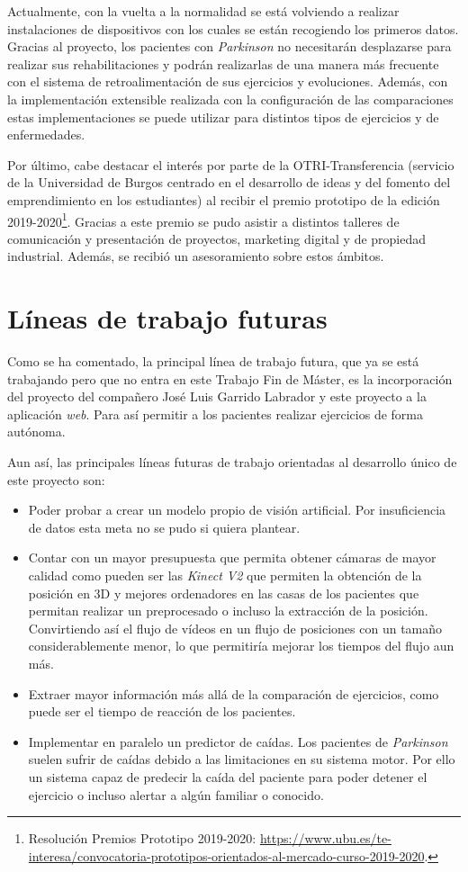 Actualmente, con la vuelta a la normalidad se está volviendo a realizar instalaciones de dispositivos con los cuales se están recogiendo los primeros datos. Gracias al proyecto, los pacientes con \textit{Parkinson} no necesitarán desplazarse para realizar sus rehabilitaciones y podrán realizarlas de una manera más frecuente con el sistema de retroalimentación de sus ejercicios y evoluciones. Además, con la implementación extensible realizada con la configuración de las comparaciones estas implementaciones se puede utilizar para distintos tipos de ejercicios y de enfermedades. 

Por último, cabe destacar el interés por parte de la OTRI-Transferencia (servicio de la Universidad de Burgos centrado en el desarrollo de ideas y del fomento del emprendimiento en los estudiantes) al recibir el premio prototipo de la edición 2019-2020\footnote{Resolución Premios Prototipo 2019-2020: \href{https://www.ubu.es/te-interesa/convocatoria-prototipos-orientados-al-mercado-curso-2019-2020}{https://www.ubu.es/te-interesa/convocatoria-prototipos-orientados-al-mercado-curso-2019-2020}.}. Gracias a este premio se pudo asistir a distintos talleres de comunicación y presentación de proyectos, marketing digital y de propiedad industrial. Además, se recibió un asesoramiento sobre estos ámbitos.

\section{Líneas de trabajo futuras}
Como se ha comentado, la principal línea de trabajo futura, que ya se está trabajando pero que no entra en este Trabajo Fin de Máster, es la incorporación del proyecto del compañero José Luis Garrido Labrador y este proyecto a la aplicación \textit{web}. Para así permitir a los pacientes realizar ejercicios de forma autónoma.

Aun así, las principales líneas futuras de trabajo orientadas al desarrollo único de este proyecto son:
\begin{itemize}
	\item Poder probar a crear un modelo propio de visión artificial. Por insuficiencia de datos esta meta no se pudo si quiera plantear.
	\item Contar con un mayor presupuesta que permita obtener cámaras de mayor calidad como pueden ser las \textit{Kinect V2} que permiten la obtención de la posición en 3D y mejores ordenadores en las casas de los pacientes que permitan realizar un preprocesado o incluso la extracción de la posición. Convirtiendo así el flujo de vídeos en un flujo de posiciones con un tamaño considerablemente menor, lo que permitiría mejorar los tiempos del flujo aun más.
	\item Extraer mayor información más allá de la comparación de ejercicios, como puede ser el tiempo de reacción de los pacientes.
	\item Implementar en paralelo un predictor de caídas. Los pacientes de \textit{Parkinson} suelen sufrir de caídas debido a las limitaciones en su sistema motor. Por ello un sistema capaz de predecir la caída del paciente para poder detener el ejercicio o incluso alertar a algún familiar o conocido.
\end{itemize}

